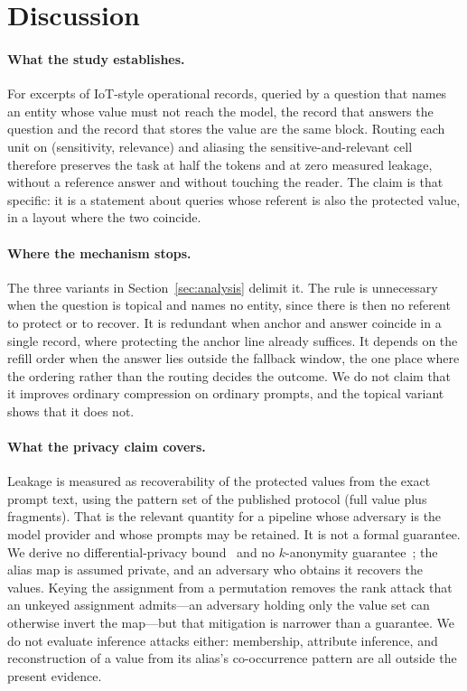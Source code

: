\section{Discussion}
\label{sec:discussion}

\paragraph{What the study establishes.}
For excerpts of IoT-style operational records, queried by a question that names an entity
whose value must not reach the model, the record that answers the question and the record
that stores the value are the same block. Routing each unit on (sensitivity, relevance) and
aliasing the sensitive-and-relevant cell therefore preserves the task at half the tokens and
at zero measured leakage, without a reference answer and without touching the reader. The
claim is that specific: it is a statement about queries whose referent is also the protected
value, in a layout where the two coincide.

\paragraph{Where the mechanism stops.}
The three variants in Section~\ref{sec:analysis} delimit it. The rule is unnecessary when the
question is topical and names no entity, since there is then no referent to protect or to
recover. It is redundant when anchor and answer coincide in a single record, where protecting
the anchor line already suffices. It depends on the refill order when the answer lies outside
the fallback window, the one place where the ordering rather than the routing decides the
outcome. We do not claim that it improves ordinary compression on ordinary prompts, and the
topical variant shows that it does not.

\paragraph{What the privacy claim covers.}
Leakage is measured as recoverability of the protected values from the exact prompt text,
using the pattern set of the published protocol (full value plus fragments). That is the
relevant quantity for a pipeline whose adversary is the model provider and whose prompts may
be retained. It is not a formal guarantee. We derive no differential-privacy
bound~\cite{dp} and no $k$-anonymity guarantee~\cite{kanon}; the alias map is assumed private,
and an adversary who obtains it recovers the values. Keying the assignment from a permutation
removes the rank attack that an unkeyed assignment admits---an adversary holding only the
value set can otherwise invert the map---but that mitigation is narrower than a guarantee. We
do not evaluate inference attacks either: membership, attribute inference, and reconstruction
of a value from its alias's co-occurrence pattern are all outside the present evidence.

